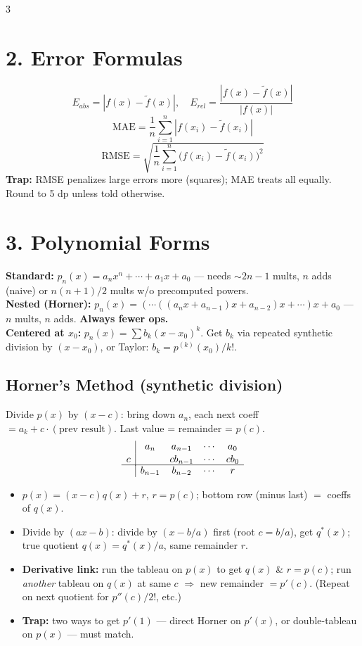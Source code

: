 \documentclass[9pt]{extarticle}
\newcommand{\hl}[1]{\textbf{\textcolor{BrickRed}{#1}}}
\begin{document}
\begin{multicols}{3}
\section{2. Error Formulas}
\begin{equation*}
E_{abs}=|f(x)-\tilde f(x)|,\quad E_{rel}=\frac{|f(x)-\tilde f(x)|}{|f(x)|}
\end{equation*}
\begin{equation*}
\text{MAE}=\frac1n\sum_{i=1}^n|f(x_i)-\tilde f(x_i)|
\end{equation*}
\begin{equation*}
\text{RMSE}=\sqrt{\frac1n\sum_{i=1}^n\big(f(x_i)-\tilde f(x_i)\big)^2}
\end{equation*}
\hl{Trap:} RMSE penalizes large errors more (squares); MAE treats all equally. Round to 5 dp unless told otherwise.

\section{3. Polynomial Forms}
\textbf{Standard:} $p_n(x)=a_nx^n+\cdots+a_1x+a_0$ — needs $\sim 2n-1$ mults, $n$ adds (naive) or $n(n+1)/2$ mults w/o precomputed powers.\\
\textbf{Nested (Horner):} $p_n(x)=(\cdots((a_nx+a_{n-1})x+a_{n-2})x+\cdots)x+a_0$ — $n$ mults, $n$ adds. \hl{Always fewer ops.}\\
\textbf{Centered at $x_0$:} $p_n(x)=\sum b_k(x-x_0)^k$. Get $b_k$ via repeated synthetic division by $(x-x_0)$, or Taylor: $b_k=p^{(k)}(x_0)/k!$.

\subsection{Horner's Method (synthetic division)}
Divide $p(x)$ by $(x-c)$: bring down $a_n$, each next coeff $=a_k+c\cdot(\text{prev result})$. Last value = remainder = $p(c)$.
\[
\begin{array}{c|cccc}
 & a_n & a_{n-1} & \cdots & a_0\\[1pt]
c & & c b_{n-1} & \cdots & c b_0\\[-1pt]
\hline
 & b_{n-1} & b_{n-2} & \cdots & r
\end{array}
\]
\begin{itemize}
\item $p(x)=(x-c)q(x)+r$, $r=p(c)$; bottom row (minus last) $=$ coeffs of $q(x)$.
\item Divide by $(ax-b)$: divide by $(x-b/a)$ first (root $c=b/a$), get $q^*(x)$; true quotient $q(x)=q^*(x)/a$, same remainder $r$.
\item \hl{Derivative link:} run the tableau on $p(x)$ to get $q(x)$ \& $r=p(c)$; run \emph{another} tableau on $q(x)$ at same $c$ $\Rightarrow$ new remainder $=p'(c)$. (Repeat on next quotient for $p''(c)/2!$, etc.)
\item \hl{Trap:} two ways to get $p'(1)$ — direct Horner on $p'(x)$, or double-tableau on $p(x)$ — must match.
\end{itemize}


\end{multicols}
\end{document}
